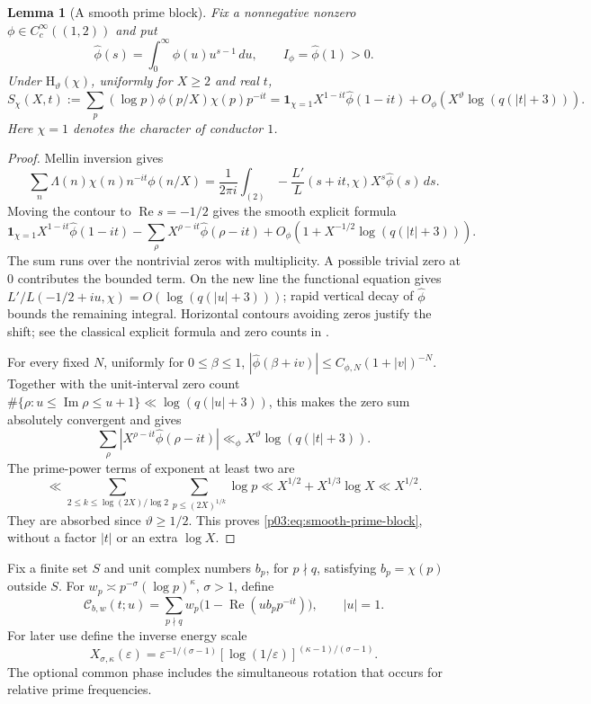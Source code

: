 \documentclass[11pt,letterpaper]{article}
\newtheorem{lemma}[theorem]{Lemma}
\theoremstyle{definition}
\theoremstyle{remark}
\newcommand{\eps}{\varepsilon}
\renewcommand{\Re}{\operatorname{Re}}
\renewcommand{\Im}{\operatorname{Im}}
\newcommand{\1}{\mathbf 1}
\begin{document}
\begin{lemma}[A smooth prime block]\label{p03:lem:smooth-prime-block}
Fix a nonnegative nonzero $\phi\in C_c^\infty((1,2))$ and put
\[
 \widehat\phi(s)=\int_0^\infty\phi(u)u^{s-1}\,du,\qquad
 I_\phi=\widehat\phi(1)>0.
\]
Under $\mathrm H_\vartheta(\chi)$, uniformly for $X\ge2$ and real $t$,
\begin{equation}\label{p03:eq:smooth-prime-block}
 S_\chi(X,t):=\sum_p(\log p)\phi(p/X)\chi(p)p^{-it}
 =\mathbf1_{\chi=1}X^{1-it}\widehat\phi(1-it)
 +O_\phi\!\left(X^\vartheta\log(q(|t|+3))\right).
\end{equation}
Here $\chi=1$ denotes the character of conductor $1$.
\end{lemma}
\begin{proof}
Mellin inversion gives
\[
 \sum_n\Lambda(n)\chi(n)n^{-it}\phi(n/X)
 =\frac1{2\pi i}\int_{(2)}
       -\frac{L'}L(s+it,\chi)X^s\widehat\phi(s)\,ds.
\]
Moving the contour to $\Re s=-1/2$ gives the smooth explicit formula
\begin{equation}\label{p03:eq:smooth-zero-formula}
 \mathbf1_{\chi=1}X^{1-it}\widehat\phi(1-it)
 -\sum_\rho X^{\rho-it}\widehat\phi(\rho-it)
 +O_\phi\!\left(1+X^{-1/2}\log(q(|t|+3))\right).
\end{equation}
The sum runs over the nontrivial zeros with multiplicity. A possible
trivial zero at $0$ contributes the bounded term. On the new line the
functional equation gives
$L'/L(-1/2+iu,\chi)=O(\log(q(|u|+3)))$; rapid vertical decay of
$\widehat\phi$ bounds the remaining integral. Horizontal contours
avoiding zeros justify the shift; see the classical explicit formula
and zero counts in \cite[Chapters~10 and~12]{MontgomeryVaughan}.

For every fixed $N$, uniformly for $0\le\beta\le1$,
$|\widehat\phi(\beta+iv)|\le C_{\phi,N}(1+|v|)^{-N}$.
Together with the unit-interval zero count
$\#\{\rho:u\le\Im\rho\le u+1\}\ll\log(q(|u|+3))$, this makes the
zero sum absolutely convergent and gives
\[
 \sum_\rho|X^{\rho-it}\widehat\phi(\rho-it)|
 \ll_\phi X^\vartheta\log(q(|t|+3)).
\]
The prime-power terms of exponent at least two are
\[
 \ll\sum_{2\le k\le\log(2X)/\log2}
       \sum_{p\le(2X)^{1/k}}\log p
 \ll X^{1/2}+X^{1/3}\log X\ll X^{1/2}.
\]
They are absorbed since $\vartheta\ge1/2$. This proves
\eqref{p03:eq:smooth-prime-block}, without a factor $|t|$ or an extra
$\log X$.
\end{proof}

Fix a finite set $S$ and unit complex numbers $b_p$, for $p\nmid q$,
satisfying $b_p=\chi(p)$ outside $S$. For
$w_p\asymp p^{-\sigma}(\log p)^\kappa$, $\sigma>1$, define
\begin{equation}\label{p03:eq:arithmetic-coherence}
 \mathcal C_{b,w}(t;u)=
 \sum_{p\nmid q}w_p\bigl(1-\Re(ub_pp^{-it})\bigr),
 \qquad |u|=1.
\end{equation}
For later use define the inverse energy scale
\[
 X_{\sigma,\kappa}(\eps)
 =\eps^{-1/(\sigma-1)}[\log(1/\eps)]^{(\kappa-1)/(\sigma-1)}.
\]
The optional common phase includes the simultaneous rotation that
occurs for relative prime frequencies.
\end{document}
